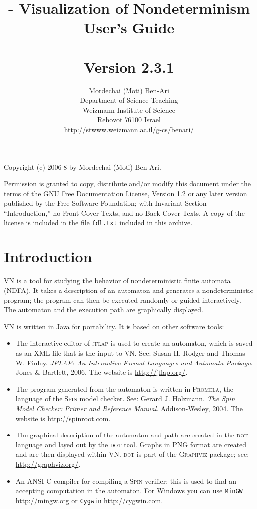 \documentclass[11pt]{article}
\title{\vn{} - Visualization of Nondeterminism\\User's Guide\\\mbox{}\\\large{Version 2.3.1}}
\author{Mordechai (Moti) Ben-Ari\\
Department of Science Teaching\\
Weizmann Institute of Science\\
Rehovot 76100 Israel\\
\textsf{http://stwww.weizmann.ac.il/g-cs/benari/}}
\newcommand{\vn}{\textsc{VN}}
\newcommand{\jf}{\textsc{jflap}}
\newcommand{\dt}{\textsc{dot}}
\newcommand{\spn}{\textsc{Spin}}
\newcommand{\prm}{\textsc{Promela}}
\newcommand{\p}[1]{\texttt{#1}}
\begin{document}
\maketitle
\thispagestyle{empty}

\vfil

\begin{center}
Copyright (c) 2006-8 by Mordechai (Moti) Ben-Ari.
\end{center}
Permission is granted to copy, distribute and/or modify this document
under the terms of the GNU Free Documentation License, Version 1.2
or any later version published by the Free Software Foundation;
with Invariant Section ``Introduction,'' no Front-Cover Texts, and no Back-Cover Texts.
A copy of the license is included in the file \p{fdl.txt}
included in this archive.
\vfil

\newpage

\section{Introduction}

\vn{} is a tool for studying the behavior of nondeterministic finite automata 
(NDFA). It takes a description of an automaton and generates a nondeterministic 
program; the program can then be executed randomly or guided interactively. The 
automaton and the execution path are graphically displayed.

\vn{} is written in Java for portability. It is based on other software tools: 
\begin{itemize}
  \item The interactive editor of \jf{} is used to 
create an automaton, which is saved as an XML file that is the input to \vn{}. See: 
Susan H. Rodger and Thomas W. Finley. \textit{JFLAP: An Interactive Formal 
Languages and Automata Package}. Jones \& Bartlett, 2006. The website is 
\url{http://jflap.org/}.
\item The program generated from the automaton is written in 
\prm{}, the language of the \spn{} model checker. See: Gerard J. Holzmann. 
\textit{The Spin Model Checker: Primer and Reference Manual}. Addison-Wesley, 
2004. The website is \url{http://spinroot.com}.
\item The graphical description of the automaton and path are created in the \dt{} 
language and layed out by the \dt{} tool. Graphs in PNG format are created and
are then displayed within \vn{}. \dt{} is part of the \textsc{Graphviz} 
package; see: \url{http://graphviz.org/}.
\item An ANSI C compiler for compiling a \spn{} verifier; this is used to find
an accepting computation in the automaton. For Windows you can use
\p{MinGW}  \url{http://mingw.org} or \p{Cygwin} \url{http://cygwin.com}.
\end{itemize}
\end{document}

